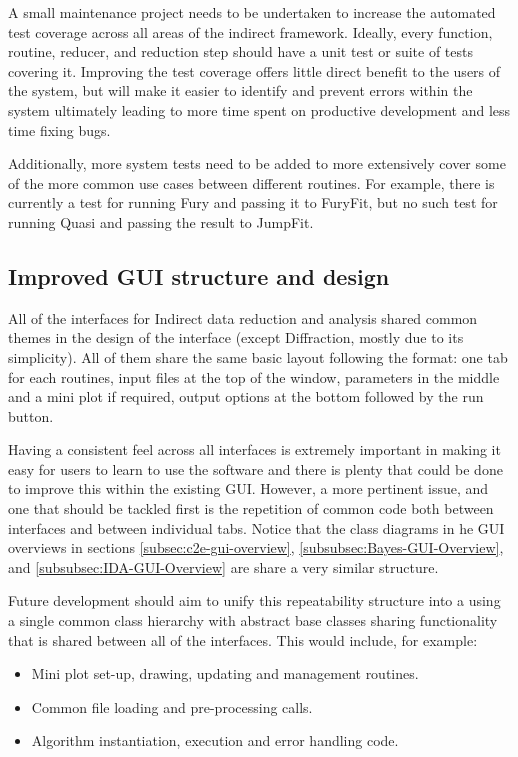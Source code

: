 \documentclass[paper=a4, fontsize=11pt]{scrartcl}	%
\numberwithin{equation}{section}															%
\numberwithin{figure}{section}																%
\numberwithin{table}{section}																%
\begin{document}
A small maintenance project needs to be undertaken to increase the automated test coverage across all areas of the indirect framework. Ideally, every function, routine, reducer, and reduction step should have a unit test or suite of tests covering it. Improving the test coverage offers little direct benefit to the users of the system, but will make it easier to identify and prevent errors within the system ultimately leading to more time spent on productive development and less time fixing bugs.

Additionally, more system tests need to be added to more extensively cover some of the more common use cases between different routines. For example, there is currently a test for running Fury and passing it to FuryFit, but no such test for running Quasi and passing the result to JumpFit.

\subsection{Improved GUI structure and design}
\label{subsec:GUI-Improvements}
All of the interfaces for Indirect data reduction and analysis shared common themes in the design of the interface (except Diffraction, mostly due to its simplicity). All of them share the same basic layout following the format: one tab for each routines, input files at the top of the window, parameters in the middle and a mini plot if required, output options at the bottom followed by the run button.

Having a consistent feel across all interfaces is extremely important in making it easy for users to learn to use the software \cite{cwickens2004} and there is plenty that could be done to improve this within the existing GUI. However, a more pertinent issue, and one that should be tackled first is the repetition of common code both between interfaces and between individual tabs. Notice that the class diagrams in he GUI overviews in sections \ref{subsec:c2e-gui-overview}, \ref{subsubsec:Bayes-GUI-Overview}, and \ref{subsubsec:IDA-GUI-Overview} are share a very similar structure.

Future development should aim to unify this repeatability structure into a using a single common class hierarchy with abstract base classes sharing functionality that is shared between all of the interfaces. This would include, for example:

\begin{itemize}
\item Mini plot set-up, drawing, updating and management routines.
\item Common file loading and pre-processing calls.
\item Algorithm instantiation, execution and error handling code.
\end{itemize}
\end{document}
